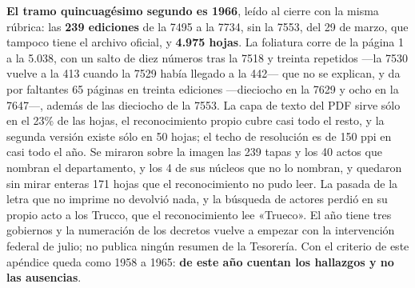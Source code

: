 \textbf{El tramo quincuagésimo segundo es 1966}, leído al cierre con la misma rúbrica: las \textbf{239 ediciones} de la 7495 a la 7734, sin la 7553, del 29 de marzo, que tampoco tiene el archivo oficial, y \textbf{4.975 hojas}. La foliatura corre de la página 1 a la 5.038, con un salto de diez números tras la 7518 y treinta repetidos ---la 7530 vuelve a la 413 cuando la 7529 había llegado a la 442--- que no se explican, y da por faltantes 65 páginas en treinta ediciones ---dieciocho en la 7629 y ocho en la 7647---, además de las dieciocho de la 7553. La capa de texto del PDF sirve sólo en el 23\% de las hojas, el reconocimiento propio cubre casi todo el resto, y la segunda versión existe sólo en 50 hojas; el techo de resolución es de 150 ppi en casi todo el año. Se miraron sobre la imagen las 239 tapas y los 40 actos que nombran el departamento, y los 4 de sus núcleos que no lo nombran, y quedaron sin mirar enteras 171 hojas que el reconocimiento no pudo leer. La pasada de la letra que no imprime no devolvió nada, y la búsqueda de actores perdió en su propio acto a los Trucco, que el reconocimiento lee «Trueco». El año tiene tres gobiernos y la numeración de los decretos vuelve a empezar con la intervención federal de julio; no publica ningún resumen de la Tesorería. Con el criterio de este apéndice queda como 1958 a 1965: \textbf{de este año cuentan los hallazgos y no las ausencias}.

